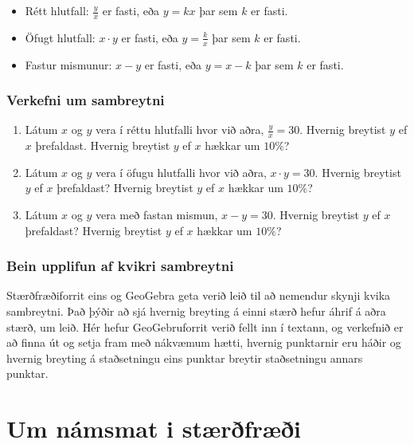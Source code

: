 \documentclass[
  icelandic,
]{book}
\providecommand{\tightlist}{%
  \setlength{\itemsep}{0pt}\setlength{\parskip}{0pt}}
\begin{document}
\begin{itemize}
\tightlist
\item
  Rétt hlutfall: \(\frac{y}{x}\) er fasti, eða \(y = kx\) þar sem \(k\) er fasti.
\item
  Öfugt hlutfall: \(x \cdot y\) er fasti, eða \(y = \frac{k}{x}\) þar sem \(k\) er fasti.\\
\item
  Fastur mismunur: \(x - y\) er fasti, eða \(y = x - k\) þar sem \(k\) er fasti.
\end{itemize}

\subsection{Verkefni um sambreytni}\label{verkefni-sambreytni}

\begin{enumerate}
\def\labelenumi{\alph{enumi}.}
\tightlist
\item
  Látum \(x\) og \(y\) vera í réttu hlutfalli hvor við aðra, \(\frac{y}{x}=30\). Hvernig breytist \(y\) ef \(x\) þrefaldast. Hvernig breytist \(y\) ef \(x\) hækkar um \(10\%\)?
\item
  Látum \(x\) og \(y\) vera í öfugu hlutfalli hvor við aðra, \(x \cdot y=30\). Hvernig breytist \(y\) ef \(x\) þrefaldast? Hvernig breytist \(y\) ef \(x\) hækkar um \(10\%\)?\\
\item
  Látum \(x\) og \(y\) vera með fastan mismun, \(x - y = 30\). Hvernig breytist \(y\) ef \(x\) þrefaldast? Hvernig breytist \(y\) ef \(x\) hækkar um \(10\%\)?
\end{enumerate}

\subsection{Bein upplifun af kvikri sambreytni}\label{ggb-sambreytni_1}

Stærðfræðiforrit eins og GeoGebra geta verið leið til að nemendur skynji kvika sambreytni. Það þýðir að sjá hvernig breyting á einni stærð hefur áhrif á aðra stærð, um leið. Hér hefur GeoGebruforrit verið fellt inn í textann, og verkefnið er að finna út og setja fram með nákvæmum hætti, hvernig punktarnir eru háðir og hvernig breyting á staðsetningu eins punktar breytir staðsetningu annars punktar.

\chapter{Um námsmat i stærðfræði}\label{namsmat_kafli}
\end{document}
